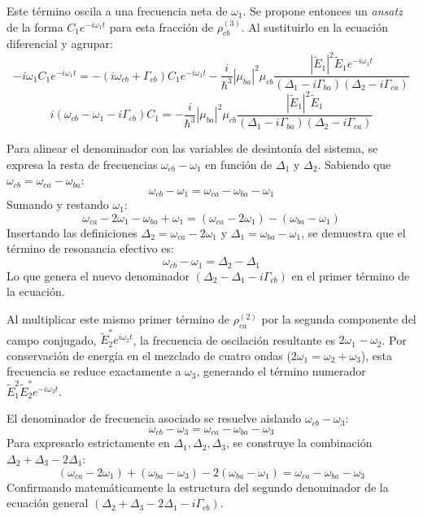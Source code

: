 \documentclass[12pt,a4paper]{article}
\begin{document}
Este término oscila a una frecuencia neta de $\omega_1$. Se propone entonces un \textit{ansatz} de la forma $C_1 e^{-i\omega_1 t}$ para esta fracción de $\rho_{cb}^{(3)}$. Al sustituirlo en la ecuación diferencial y agrupar:
\begin{equation}
-i\omega_1 C_1 e^{-i\omega_1 t} = -(i\omega_{cb} + \Gamma_{cb}) C_1 e^{-i\omega_1 t} - \frac{i}{\hbar^3} |\mu_{ba}|^2 \mu_{cb} \frac{|\tilde{E}_1|^2 \tilde{E}_1 e^{-i\omega_1 t}}{(\Delta_1 - i\Gamma_{ba})(\Delta_2 - i\Gamma_{ca})}
\end{equation}
\begin{equation}
i(\omega_{cb} - \omega_1 - i\Gamma_{cb}) C_1 = - \frac{i}{\hbar^3} |\mu_{ba}|^2 \mu_{cb} \frac{|\tilde{E}_1|^2 \tilde{E}_1}{(\Delta_1 - i\Gamma_{ba})(\Delta_2 - i\Gamma_{ca})}
\end{equation}

Para alinear el denominador con las variables de desintonía del sistema, se expresa la resta de frecuencias $\omega_{cb} - \omega_1$ en función de $\Delta_1$ y $\Delta_2$. Sabiendo que $\omega_{cb} = \omega_{ca} - \omega_{ba}$:
\begin{equation}
\omega_{cb} - \omega_1 = \omega_{ca} - \omega_{ba} - \omega_1
\end{equation}
Sumando y restando $\omega_1$:
\begin{equation}
\omega_{ca} - 2\omega_1 - \omega_{ba} + \omega_1 = (\omega_{ca} - 2\omega_1) - (\omega_{ba} - \omega_1)
\end{equation}
Insertando las definiciones $\Delta_2 = \omega_{ca} - 2\omega_1$ y $\Delta_1 = \omega_{ba} - \omega_1$, se demuestra que el término de resonancia efectivo es:
\begin{equation}
\omega_{cb} - \omega_1 = \Delta_2 - \Delta_1
\end{equation}
Lo que genera el nuevo denominador $(\Delta_2 - \Delta_1 - i\Gamma_{cb})$ en el primer término de la ecuación.


Al multiplicar este mismo primer término de $\rho_{ca}^{(2)}$ por la segunda componente del campo conjugado, $\tilde{E}_2^* e^{i\omega_2 t}$, la frecuencia de oscilación resultante es $2\omega_1 - \omega_2$. Por conservación de energía en el mezclado de cuatro ondas ($2\omega_1 = \omega_2 + \omega_3$), esta frecuencia se reduce exactamente a $\omega_3$, generando el término numerador $\tilde{E}_1^2 \tilde{E}_2^* e^{-i\omega_3 t}$.

El denominador de frecuencia asociado se resuelve aislando $\omega_{cb} - \omega_3$:
\begin{equation}
\omega_{cb} - \omega_3 = \omega_{ca} - \omega_{ba} - \omega_3
\end{equation}
Para expresarlo estrictamente en $\Delta_1, \Delta_2, \Delta_3$, se construye la combinación $\Delta_2 + \Delta_3 - 2\Delta_1$:
\begin{equation}
(\omega_{ca} - 2\omega_1) + (\omega_{ba} - \omega_3) - 2(\omega_{ba} - \omega_1) = \omega_{ca} - \omega_{ba} - \omega_3
\end{equation}
Confirmando matemáticamente la estructura del segundo denominador de la ecuación general $(\Delta_2 + \Delta_3 - 2\Delta_1 - i\Gamma_{cb})$.
\end{document}

